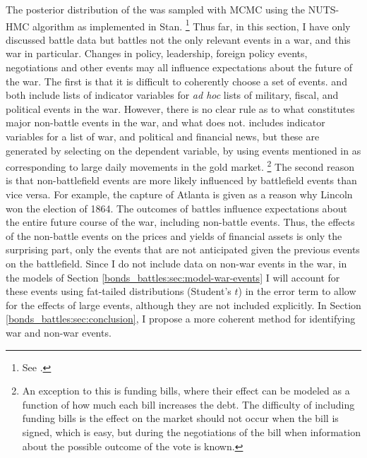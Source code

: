 The posterior distribution of the was sampled with MCMC using the NUTS-HMC algorithm as implemented in Stan.%
\footnote{See \parencites{Stan2015a}.}
Thus far, in this section, I have only discussed battle data but battles not the only relevant events in a war, and this war in particular.
Changes in policy, leadership, foreign policy events, negotiations and other events may all influence expectations about the future of the war.
The first is that it is difficult to coherently choose a set of events.
\textcite{McCandless1996} and \textcite{SmithSmith1997} both include lists of indicator variables for \textit{ad hoc} lists of military, fiscal, and political events in the war.
However, there is no clear rule as to what constitutes major non-battle events in the war, and what does not.
\textcite{SmithSmith1997} includes indicator variables for a list of war, and political and financial news, but these are generated by selecting on the dependent variable, by using events mentioned in \textcite{Mitchell1903} as corresponding to large daily movements in the gold market.%
\footnote{
  An exception to this is funding bills, where their effect can be modeled as a function of how much each bill increases the debt.
  The difficulty of including funding bills is the effect on the market should not occur when the bill is signed, which is easy, but during the negotiations of the bill when information about the possible outcome of the vote is known.
}
The second reason is that non-battlefield events are more likely influenced by battlefield events than vice versa.
For example, the capture of Atlanta is given as a reason why Lincoln won the election of 1864.
The outcomes of battles influence expectations about the entire future course of the war, including non-battle events.
Thus, the effects of the non-battle events on the prices and yields of financial assets is only the surprising part, only the events that are not anticipated given the previous events on the battlefield.
Since I do not include data on non-war events in the war, in the models of Section \ref{bonds_battles:sec:model-war-events} I will account for these events using fat-tailed distributions (Student's $t$) in the error term to allow for the effects of large events, although they are not included explicitly.
In Section \ref{bonds_battles:sec:conclusion}, I propose a more coherent method for identifying war and non-war events.


